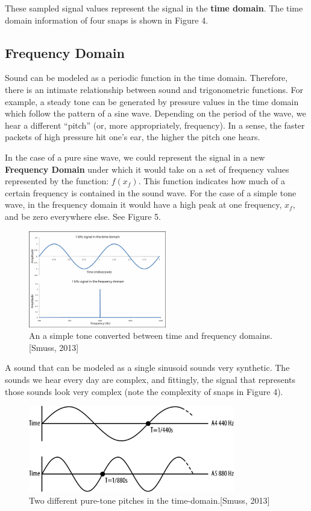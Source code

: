 \documentclass[DIV=calc, paper=a4, fontsize=11pt, twocolumn]{scrartcl}   %
\begin{document}
These sampled signal values represent the signal in the \textbf{time domain}. The time domain information of four snaps is shown in Figure 4.
\subsection{Frequency Domain}
Sound can be modeled as a periodic function in the time domain. Therefore, there is an intimate relationship between sound and trigonometric functions. For example, a steady tone can be generated by pressure values in the time domain which follow the pattern of a sine wave. Depending on the period of the wave, we hear a different ``pitch'' (or, more appropriately, frequency). In a sense, the faster packets of high pressure hit one's ear, the higher the pitch one hears.
\par  In the case of a pure sine wave, we could represent the signal in a new \textbf{Frequency Domain} under which it would take on a set of frequency values represented by the function: $f(x_f)$. This function indicates how much of a certain frequency is contained in the sound wave. For the case of a simple tone wave, in the frequency domain it would have a high peak at one frequency, $x_f$, and be zero everywhere else. See Figure 5.

\begin{figure}[h]
\centering
\includegraphics[width=60mm]{figures/twodomains.png}
\caption{An a simple tone converted between time and frequency domains.[Smuss, 2013]}
\label{overflow}
\end{figure}

\par A sound that can be modeled as a single sinusoid sounds very synthetic. The sounds we hear every day are complex, and fittingly, the signal that represents those sounds look very complex (note the complexity of snaps in Figure 4).

\begin{figure}[h]
\centering
\includegraphics[width=90mm]{figures/PitchGraph.png}
\caption{Two different pure-tone pitches in the time-domain.[Smuss, 2013]}
\label{overflow}
\end{figure}
\end{document}
